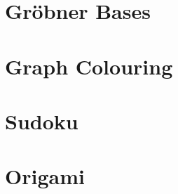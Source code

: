 \documentclass[11pt]{article}
\theoremstyle{definition}
\begin{document}
    \section{Gr\"obner Bases}

    



    \section{Graph Colouring}
    
    

        
        
    \section{Sudoku}

    
        
        

    \section{Origami}

    \appendix
    

    
    
    
\end{document}
